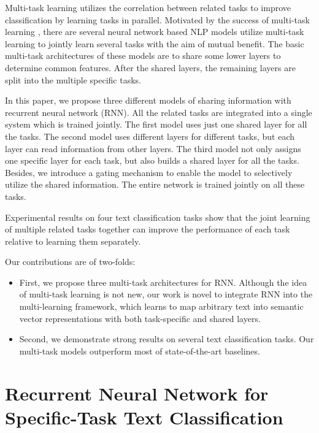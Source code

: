 \documentclass{article}
\begin{document}
Multi-task learning utilizes the correlation between related tasks to improve classification by learning tasks in parallel. Motivated by the success of multi-task learning \cite{caruana1997multitask}, there are several neural network based NLP models \cite{collobert2008unified,liu2015representation} utilize multi-task learning to jointly learn several tasks with the aim of mutual benefit.  The basic multi-task architectures of these models are to share some lower layers to determine common features. After the shared layers, the remaining layers are split into the multiple specific tasks.

In this paper, we propose three different models of sharing information with recurrent neural network (RNN). All the related tasks are integrated into a single system which is trained jointly. The first model uses just one shared layer for all the tasks. The second model uses different layers for different tasks, but each layer can read information from other layers. The third model not only assigns one specific layer for each task, but also builds a shared layer for all the tasks.
Besides, we introduce a gating mechanism to enable the model to selectively utilize the shared information. The entire network is trained jointly on all these tasks.

Experimental results on four text classification tasks show that the joint learning of multiple related tasks together can improve the performance of each task relative to learning them separately.

Our contributions are of two-folds:
\begin{itemize}
  \item First, we propose three multi-task architectures for RNN. Although the idea of multi-task learning is not new, our work is novel to integrate RNN into the multi-learning framework, which learns to map arbitrary text into semantic vector representations with both task-specific and shared layers.
  \item Second, we demonstrate strong results on several text classification tasks. Our multi-task models outperform most of state-of-the-art baselines.
\end{itemize}









\section{Recurrent Neural Network for Specific-Task Text Classification}
\end{document}
